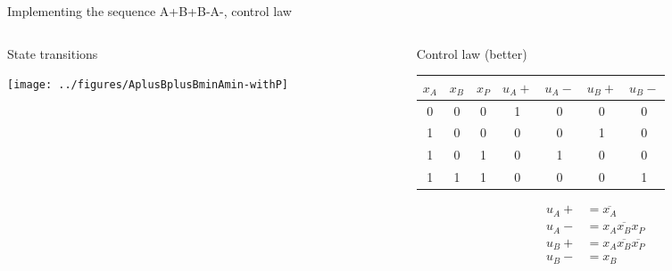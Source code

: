 \documentclass[presentation,aspectratio=1610]{beamer}
\renewcommand*{\not}[1]{\ensuremath{\bar{#1}}}
\renewcommand*{\not}[1]{\ensuremath{\overline{#1}}}
\begin{document}
\begin{frame}[label={sec:orge354360}]{Implementing the sequence A+B+B-A-, control law}
\begin{columns}
\begin{column}{0.4\columnwidth}
\begin{block}{State transitions}
\begin{center}
\texttt{[image: ../figures/AplusBplusBminAmin-withP]}
\end{center}
\end{block}
\end{column}

\begin{column}{0.6\columnwidth}
\begin{block}{Control law (better)}
\begin{center}
\begin{tabular}{|ccc|cccc|}
\hline
\(x_A\) & \(x_B\) & \(x_P\) & \(u_A+\) & \(u_A-\) & \(u_B+\) & \(u_B-\)\\
\hline
0 & 0 & 0 & 1 & 0 & 0 & 0\\
1 & 0 & 0 & 0 & 0 & 1 & 0\\
1 & 0 & 1 & 0 & 1 & 0 & 0\\
1 & 1 & 1 & 0 & 0 & 0 & 1\\
\hline
\end{tabular}
\end{center}

\begin{align*}
  u_A+ &= \not{x_A}\\
  u_A- &= x_A\not{x_B}x_P\\
  u_B+ &= x_A\not{x_B}\not{x_P}\\
  u_B- &= x_B
\end{align*}
\end{block}
\end{column}
\end{columns}
\end{frame}
\end{document}
